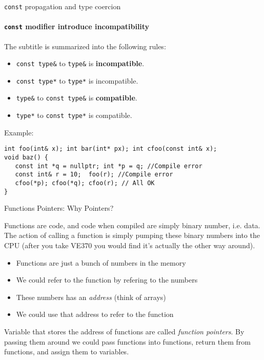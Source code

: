 \begin{frame}[fragile]{\texttt{const} propagation and type coercion}
\framesubtitle{\texttt{const} modifier introduce incompatibility}

	The subtitle is summarized into the following rules:
	
	\begin{itemize}
		\item \texttt{const type\&} to \texttt{type\&} is \textbf{incompatible}.
		\item \texttt{const type*} to \texttt{type*} is incompatible.
		\item \texttt{type\&} to \texttt{const type\&} is \textbf{compatible}.
		\item \texttt{type*} to \texttt{const type*} is compatible.
	\end{itemize}
Example:
\begin{verbatim}
int foo(int& x); int bar(int* px); int cfoo(const int& x);
void baz() {
   const int *q = nullptr; int *p = q; //Compile error
   const int& r = 10;  foo(r); //Compile error
   cfoo(*p); cfoo(*q); cfoo(r); // All OK
}
\end{verbatim}

\end{frame}


\begin{frame}{Functions Pointers: Why Pointers?}

	
	Functions are code, and code when compiled are simply binary number, i.e. data. The action of calling a function is simply pumping these binary numbers into the CPU (after you take VE370 you would find it's actually the other way around).
	
	\begin{itemize}
		\item Functions are just a bunch of numbers in the memory
		\item We could refer to the function by refering to the numbers
		\item These numbers has an \textit{address} (think of arrays)
		\item We could use that address to refer to the function
	\end{itemize}
	
	Variable that stores the address of functions are called \textit{function pointers}. By passing them around we could pass functions into functions, return them from functions, and assign them to variables. 
\end{frame}

